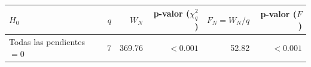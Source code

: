 
\begin{tabular}{lrrrrr}
\toprule
$H_0$ & $q$ & $W_N$ & p-valor ($\chi^2_q$) & $F_N=W_N/q$ & p-valor ($F$)\\
\midrule
Todas las pendientes $=0$ & 7 & 369.76 & $<0.001$ & 52.82 & $<0.001$\\
\bottomrule
\end{tabular}
